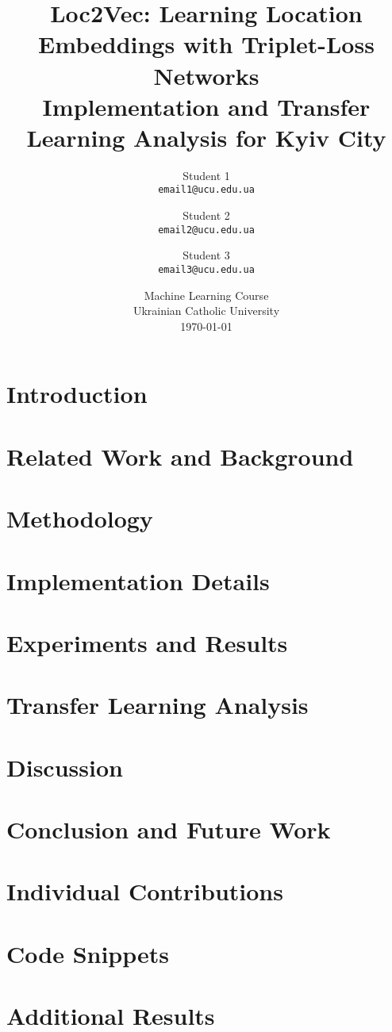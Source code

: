 \documentclass[12pt,a4paper]{article}
\title{\textbf{Loc2Vec: Learning Location Embeddings with Triplet-Loss Networks}\\
\large Implementation and Transfer Learning Analysis for Kyiv City}
\author{
    Student 1\\
    \texttt{email1@ucu.edu.ua}
    \and
    Student 2\\
    \texttt{email2@ucu.edu.ua}
    \and
    Student 3\\
    \texttt{email3@ucu.edu.ua}
}
\date{
    Machine Learning Course\\
    Ukrainian Catholic University\\
    \today
}
\begin{document}
\maketitle

\begin{abstract}

\end{abstract}

\tableofcontents
\newpage

\section{Introduction}


\section{Related Work and Background}


\section{Methodology}


\section{Implementation Details}


\section{Experiments and Results}


\section{Transfer Learning Analysis}


\section{Discussion}


\section{Conclusion and Future Work}


\section{Individual Contributions}





\appendix
\section{Code Snippets}


\section{Additional Results}

\end{document}
